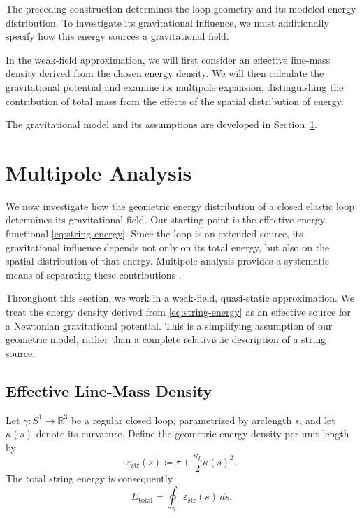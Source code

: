 \documentclass{article}
\numberwithin{tm}{section}
\numberwithin{dn}{section}
\numberwithin{as}{section}
\numberwithin{rk}{section}
\numberwithin{lem}{section}
\numberwithin{ax}{section}
\numberwithin{pp}{section}
\numberwithin{eg}{section}
\numberwithin{war}{section}
\numberwithin{equation}{section}
\numberwithin{prop}{section}
\numberwithin{nt}{section}
\numberwithin{rc}{section}
\begin{document}
The preceding construction determines the loop geometry and
its modeled energy distribution. To investigate its
gravitational influence, we must additionally specify how
this energy sources a gravitational field.

In the weak-field approximation, we will first consider an
effective line-mass density derived from the chosen energy
density. We will then calculate the gravitational potential
and examine its multipole expansion, distinguishing the
contribution of total mass from the effects of the spatial
distribution of energy.

The gravitational model and its assumptions are developed
in Section~\ref{sec:multipoles}.

\section{Multipole Analysis}
\label{sec:multipoles}

We now investigate how the geometric energy distribution of a
closed elastic loop determines its gravitational field. Our
starting point is the effective energy functional
\eqref{eq:string-energy}. Since the loop is an extended source,
its gravitational influence depends not only on its total energy,
but also on the spatial distribution of that energy. Multipole
analysis provides a systematic means of separating these
contributions \cite{PoissonWill2014Gravity}.

Throughout this section, we work in a weak-field, quasi-static
approximation. We treat the energy density derived from
\eqref{eq:string-energy} as an effective source for a Newtonian
gravitational potential. This is a simplifying assumption of
our geometric model, rather than a complete relativistic
description of a string source.

\subsection{Effective Line-Mass Density}

Let $\gamma:S^1\to\mathbb{R}^3$ be a regular closed loop,
parametrized by arclength $s$, and let
$\kappa(s)$ denote its curvature. Define the geometric energy
density per unit length by
\begin{equation}
	\varepsilon_{\mathrm{str}}(s)
	\coloneq
	\tau+\frac{\kappa_b}{2}\kappa(s)^2.
\end{equation}
The total string energy is consequently
\begin{equation}
	E_{\mathrm{total}}
	=
	\oint_\gamma
	\varepsilon_{\mathrm{str}}(s)\,ds.
\end{equation}
\end{document}
